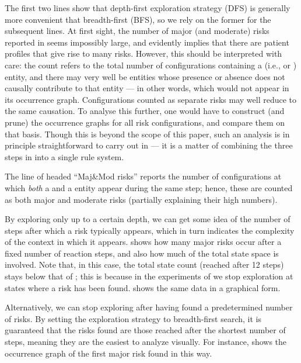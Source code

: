 The first two lines show that depth-first exploration strategy (DFS) is generally more convenient that breadth-first (BFS), so we rely on the former for the subsequent lines. At first sight, the number of major (and moderate) risks reported in  seems impossibly large, and evidently implies that there are patient profiles that give rise to many risks. However, this should be interpreted with care: the count refers to the total number of configurations containing a \Forbidden (i.e., \major or \minor) entity, and there may very well be entities whose presence or absence does not causally contribute to that \Forbidden entity --- in other words, which would not appear in its occurrence graph. Configurations counted as separate risks may well reduce to the same causation. To analyse this further, one would have to construct (and prune) the occurrence graphs for all risk configurations, and compare them on that basis. Though this is beyond the scope of this paper, such an analysis is in principle straightforward to carry out in \GROOVE --- it is a matter of combining the three steps in  into a single rule system.

The line of  headed ``Maj\&Mod risks'' reports the number of configurations at which \emph{both} a \major and a \moderate entity appear during the same step; hence, these are counted as both major and moderate risks (partially explaining their high numbers).
 
\medskip\noindent By exploring only up to a certain depth, we can get some idea of the number of steps after which a risk typically appears, which in turn indicates the complexity of the context in which it appears.  shows how many major risks occur after a fixed number of reaction steps, and also how much of the total state space is involved. Note that, in this case, the total state count (reached after 12 steps) stays below that of ; this is because in the experiments of  we stop exploration at states where a risk has been found.  shows the same data in a graphical form.

\medskip\noindent Alternatively, we can stop exploring after having found a predetermined number of risks. By setting the exploration strategy to breadth-first search, it is guaranteed that the risks found are those reached after the shortest number of steps, meaning they are the easiest to analyze visually. For instance,  shows the occurrence graph of the first major risk found in this way.


